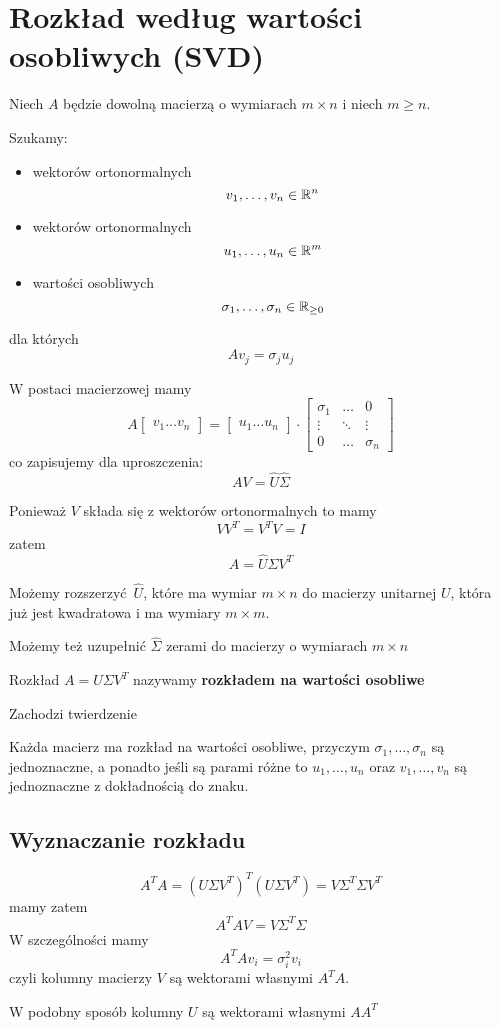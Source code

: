 \section{Rozkład według wartości osobliwych (SVD)}

Niech \( A \) będzie dowolną macierzą o wymiarach \( m \times n \) i niech \( m \geq n \).

Szukamy:
\begin{itemize}
    \item wektorów ortonormalnych 
    \[
        v_1, \dots, v_n \in \mathbb{R}^n
    \]
    
    \item wektorów ortonormalnych
    \[
        u_1, \dots, u_n \in \mathbb{R}^m
    \]
    
    \item wartości osobliwych
    \[
        \sigma_1, \dots, \sigma_n \in \mathbb{R}_{\geq 0}
    \]
\end{itemize}
dla których
\[
    Av_j = \sigma_j u_j
\]

W postaci macierzowej mamy
\[
    A \begin{bmatrix}
        v_1 \dots v_n
    \end{bmatrix}
    =\begin{bmatrix}
        u_1 \dots u_n
    \end{bmatrix}
    \cdot
    \begin{bmatrix}
        \sigma_1 & \hdots & 0 \\
        \vdots & \ddots & \vdots \\
        0 & \hdots & \sigma_n
    \end{bmatrix}
\]
co zapisujemy dla uproszczenia:
\[
    AV = \widehat U \widehat \Sigma
\]

Ponieważ \( V \) składa się z wektorów ortonormalnych to mamy 
\[ VV^T = V^TV = I \]
zatem
\[ A = \widehat U \widehat \Sigma V^T\]

Możemy rozszerzyć \( \widehat U \), które ma wymiar \( m \times n \) do macierzy unitarnej \( U \), która już jest kwadratowa i ma wymiary \( m \times m \).

Możemy też uzupełnić \( \widehat \Sigma \) zerami do macierzy o wymiarach \( m \times n \)

Rozkład \( A = U\Sigma V^T \) nazywamy \textbf{rozkładem na wartości osobliwe}

Zachodzi twierdzenie
\begin{theorem}
Każda macierz ma rozkład na wartości osobliwe, przyczym \( \sigma_1, \dots, \sigma_n \) są jednoznaczne, a ponadto jeśli są parami różne to \( u_1, \dots, u_n \) oraz \(v_1, \dots, v_n\) są jednoznaczne z dokładnością do znaku.
\end{theorem}

\subsection{Wyznaczanie rozkładu}
\[
    A^TA = (U\Sigma V^T)^T(U\Sigma V^T) = V\Sigma^T\Sigma V^T
\]
mamy zatem
\[
    A^TAV = V\Sigma^T\Sigma
\]
W szczególności mamy
\[
    A^TAv_i = \sigma^2_i v_i
\]
czyli kolumny macierzy \( V \) są wektorami własnymi \( A^TA\).

W podobny sposób kolumny \( U \) są wektorami własnymi \( AA^T \)
